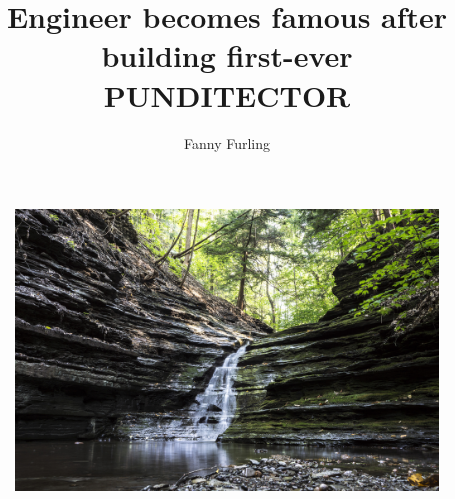 \documentclass{gescons}
\title {Engineer becomes famous after building first-ever PUNDITECTOR}
\author{Fanny Furling}
\begin{document}
    \maketitle
    
    \begin{lead}
        \lipsum[1]
    \end{lead}
    
    \begin{multicols}{3}
        \lipsum[2-11]
    \end{multicols}
    
    \begin{figure}
        \includegraphics[width=\textwidth]{landscape}
    \end{figure}
\end{document}
